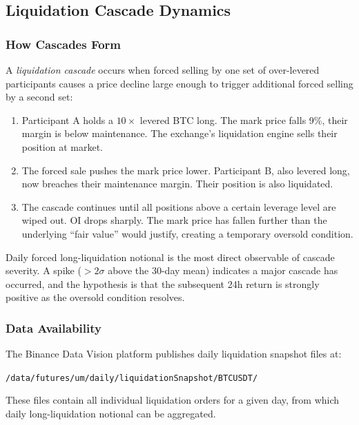 \documentclass[12pt, a4paper]{article}
\theoremstyle{plain}
\theoremstyle{definition}
\begin{document}
\subsection{Liquidation Cascade Dynamics}
\label{sec:cascade_theory}

\subsubsection{How Cascades Form}

A \emph{liquidation cascade} occurs when forced selling by one set of
over-levered participants causes a price decline large enough to trigger
additional forced selling by a second set:

\begin{enumerate}
  \item Participant A holds a $10\times$ levered BTC long.  The mark price
        falls 9\%, their margin is below maintenance.  The exchange's
        liquidation engine sells their position at market.
  \item The forced sale pushes the mark price lower.  Participant B,
        also levered long, now breaches their maintenance margin.
        Their position is also liquidated.
  \item The cascade continues until all positions above a certain
        leverage level are wiped out.  OI drops sharply.  The mark
        price has fallen further than the underlying ``fair value'' would
        justify, creating a temporary oversold condition.
\end{enumerate}

Daily forced long-liquidation notional is the most direct observable of
cascade severity.  A spike ($>2\sigma$ above the 30-day mean) indicates
a major cascade has occurred, and the hypothesis is that the subsequent
24h return is strongly positive as the oversold condition resolves.

\subsubsection{Data Availability}

The Binance Data Vision platform publishes daily liquidation snapshot
files at:
\begin{center}
\texttt{/data/futures/um/daily/liquidationSnapshot/BTCUSDT/}
\end{center}
These files contain all individual liquidation orders for a given day,
from which daily long-liquidation notional can be aggregated.
\end{document}
